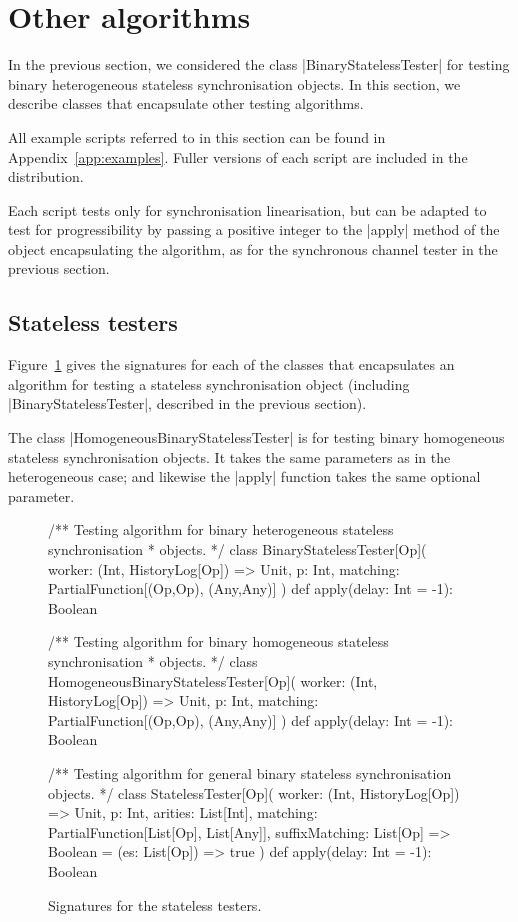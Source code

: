 \section{Other algorithms}
\label{sec:algorithms}

In the previous section, we considered the class |BinaryStatelessTester| for
testing binary heterogeneous stateless synchronisation objects.  In this
section, we describe classes that encapsulate other testing algorithms.

All example scripts referred to in this section can be found in
Appendix~\ref{app:examples}.  Fuller versions of each script are included in
the distribution.

Each script tests only for synchronisation linearisation, but can be adapted
to test for progressibility by passing a positive integer to the |apply|
method of the object encapsulating the algorithm, as for the synchronous
channel tester in the previous section.


\subsection{Stateless testers}

Figure~\ref{fig:stateless-testers} gives the signatures for each of the
classes that encapsulates an algorithm for testing a stateless synchronisation
object (including |BinaryStatelessTester|, described in the previous section).

The class |HomogeneousBinaryStatelessTester| is for testing binary homogeneous
stateless synchronisation objects.  It takes the same parameters as in the
heterogeneous case; and likewise the |apply| function takes the same optional
parameter.


\begin{figure}
\begin{scala}
/** Testing algorithm for binary heterogeneous stateless synchronisation
  * objects. */
class BinaryStatelessTester[Op](
    worker: (Int, HistoryLog[Op]) => Unit,
    p: Int,
    matching: PartialFunction[(Op,Op), (Any,Any)]
){
  def apply(delay: Int = -1): Boolean
}

/** Testing algorithm for binary homogeneous stateless synchronisation
  * objects. */
class HomogeneousBinaryStatelessTester[Op](
    worker: (Int, HistoryLog[Op]) => Unit,
    p: Int,
    matching: PartialFunction[(Op,Op), (Any,Any)]
){
  def apply(delay: Int = -1): Boolean
}

/** Testing algorithm for general binary stateless synchronisation objects. */
class StatelessTester[Op](  
    worker: (Int, HistoryLog[Op]) => Unit,
    p: Int, 
    arities: List[Int],
    matching: PartialFunction[List[Op], List[Any]],
    suffixMatching: List[Op] => Boolean = (es: List[Op]) => true
){
  def apply(delay: Int = -1): Boolean
}
\end{scala}
\caption{Signatures for the stateless testers.\label{fig:stateless-testers}}
\end{figure}

